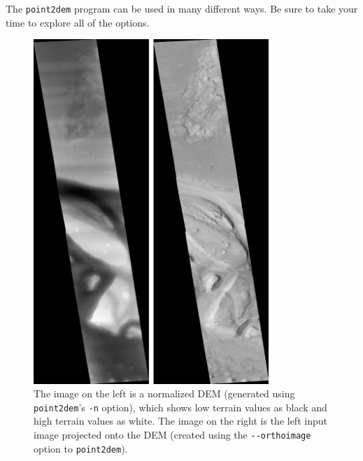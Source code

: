 \noindent
The \texttt{point2dem} program can be used in many different ways.  Be
sure to take your time to explore all of the options.

\begin{figure}
\hfill
\begin{minipage}{3.5in}
\includegraphics[width=3.5in]{images/p19-norm_ortho.png}
\end{minipage}
\hfill
\begin{minipage}{2in}
\caption[P19 Normalized DEM and Orthophoto]{
    \label{p19-norm_ortho}
	The image on the left is a normalized DEM (generated using
        \texttt{point2dem}'s 
        \texttt{-n} option), which shows low terrain values as black
        and high terrain values as white.  The image on the right is
        the left input image projected onto the DEM (created using the
        \texttt{-\/-orthoimage} option to \texttt{point2dem}).  }
\end{minipage}
\hfill
\end{figure}

%

